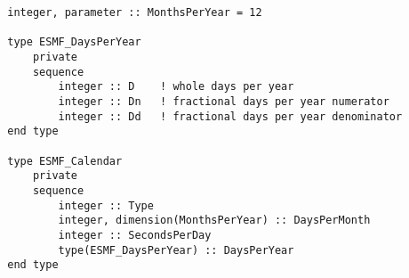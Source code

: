 \begin{verbatim}
        integer, parameter :: MonthsPerYear = 12
            
        type ESMF_DaysPerYear
            private
            sequence
                integer :: D    ! whole days per year
                integer :: Dn   ! fractional days per year numerator
                integer :: Dd   ! fractional days per year denominator
        end type

        type ESMF_Calendar
            private
            sequence
                integer :: Type
                integer, dimension(MonthsPerYear) :: DaysPerMonth 
                integer :: SecondsPerDay
                type(ESMF_DaysPerYear) :: DaysPerYear
        end type
\end{verbatim}
